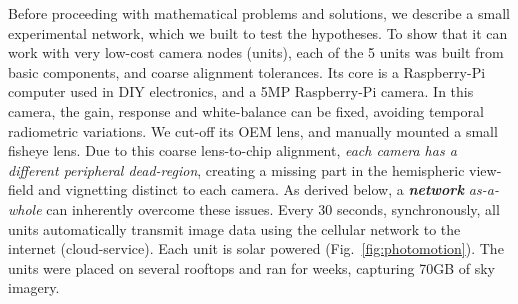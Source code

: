 \documentclass[runningheads]{llncs}
\begin{document}
Before proceeding with mathematical problems and solutions, we describe  a small experimental network, which we built to test the hypotheses. To show that it can work with very low-cost  camera nodes (units), each of the 5 units was built from basic components, and coarse alignment tolerances. Its core is a Raspberry-Pi computer used in DIY electronics, and a 5MP Raspberry-Pi camera. In this camera, the gain, response and white-balance can be fixed, avoiding temporal radiometric variations. We cut-off its OEM lens, and manually mounted a small fisheye lens. Due to this coarse lens-to-chip alignment, {\em each camera has a different peripheral dead-region}, creating a missing part in the hemispheric view-field and vignetting distinct to each camera. As derived below, a {\em {\bf network} as-a-whole} can inherently overcome these issues. Every 30 seconds, synchronously, all units automatically transmit image data using the cellular network to the internet (cloud-service). Each unit is solar powered (Fig.~\ref{fig:photomotion}).
The units were placed on several rooftops and ran for weeks, capturing 70GB of sky imagery.
\end{document}
